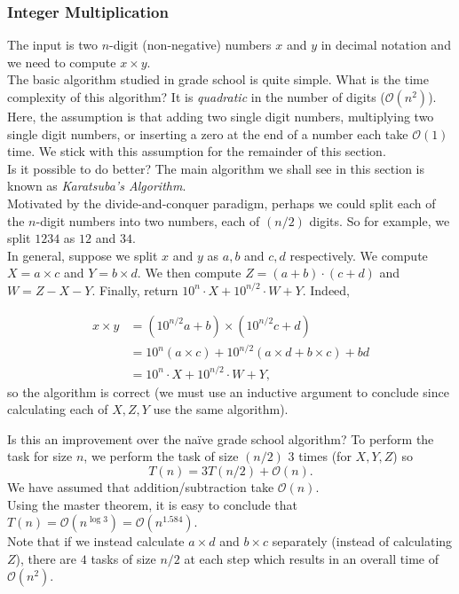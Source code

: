 \subsubsection{Integer Multiplication}

The input is two $n$-digit (non-negative) numbers $x$ and $y$ in decimal notation and we need to compute $x\times y$.\\

The basic algorithm studied in grade school is quite simple. What is the time complexity of this algorithm? It is \textit{quadratic} in the number of digits ($\mathcal{O}(n^2)$). Here, the assumption is that adding two single digit numbers, multiplying two single digit numbers, or inserting a zero at the end of a number each take $\mathcal{O}(1)$ time. We stick with this assumption for the remainder of this section.\\

Is it possible to do better? The main algorithm we shall see in this section is known as \textit{Karatsuba's Algorithm}.\\
Motivated by the divide-and-conquer paradigm, perhaps we could split each of the $n$-digit numbers into two numbers, each of $(n/2)$ digits. So for example, we split $1234$ as $12$ and $34$.\\
In general, suppose we split $x$ and $y$ as $a,b$ and $c,d$ respectively. We compute $X=a\times c$ and $Y=b\times d$. We then compute $Z=(a+b)\cdot(c+d)$ and $W=Z-X-Y$. Finally, return $10^n\cdot X + 10^{n/2}\cdot W + Y$. Indeed,

\begin{align*}
	x\times y &= (10^{n/2}a+b)\times(10^{n/2}c+d) \\
		&= 10^n (a\times c) + 10^{n/2} (a\times d+b\times c) + bd \\
		&= 10^n\cdot X + 10^{n/2}\cdot W + Y,
\end{align*}
so the algorithm is correct (we must use an inductive argument to conclude since calculating each of $X, Z, Y$ use the same algorithm).

Is this an improvement over the na\"ive grade school algorithm? To perform the task for size $n$, we perform the task of size $(n/2)$ $3$ times (for $X, Y, Z$) so
\[ T(n) = 3 T(n/2) + \mathcal{O}(n). \]
We have assumed that addition/subtraction take $\mathcal{O}(n)$.\\
Using the master theorem, it is easy to conclude that $T(n)=\mathcal{O}(n^{\log 3}) = \mathcal{O}(n^{1.584})$.\\ Note that if we instead calculate $a\times d$ and $b\times c$ separately (instead of calculating $Z$), there are $4$ tasks of size $n/2$ at each step which results in an overall time of $\mathcal{O}(n^2)$.\\


